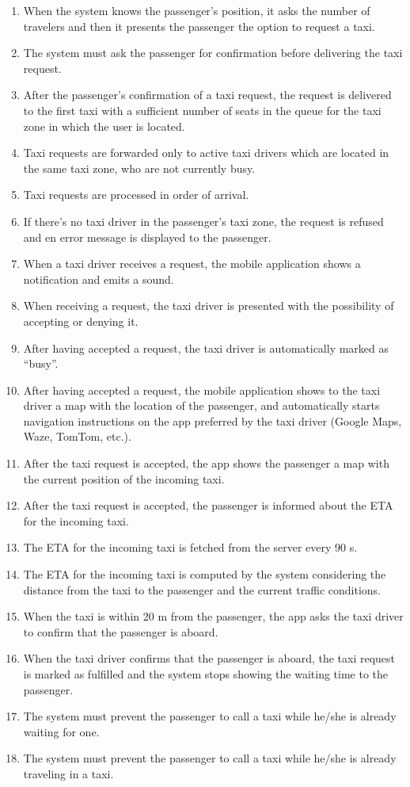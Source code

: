 \begin{enumerate}
	\item When the system knows the passenger's position, it asks the number of travelers and then it presents the passenger the option to request a taxi.
	\item The system must ask the passenger for confirmation before delivering the taxi request.
	\item After the passenger's confirmation of a taxi request, the request is delivered to the first taxi with a sufficient number of seats in the queue for the taxi zone in which the user is located.
	\item Taxi requests are forwarded only to active taxi drivers which are located in the same taxi zone, who are not currently busy.
	\item Taxi requests are processed in order of arrival.
	\item If there's no taxi driver in the passenger's taxi zone, the request is refused and en error message is displayed to the passenger.
	\item When a taxi driver receives a request, the mobile application shows a notification and emits a sound.
	\item When receiving a request, the taxi driver is presented with the possibility of accepting or denying it.
	\item After having accepted a request, the taxi driver is automatically marked as ``busy''.
	\item After having accepted a request, the mobile application shows to the taxi driver a map with the location of the passenger, and automatically starts navigation instructions on the app preferred by the taxi driver (Google Maps, Waze, TomTom, etc.).
	\item After the taxi request is accepted, the app shows the passenger a map with the current position of the incoming taxi.
	\item After the taxi request is accepted, the passenger is informed about the ETA for the incoming taxi.
	\item The ETA for the incoming taxi is fetched from the server every 90 s.
	\item The ETA for the incoming taxi is computed by the system considering the distance from the taxi to the passenger and the current traffic conditions.
	\item When the taxi is within 20 m from the passenger, the app asks the taxi driver to confirm that the passenger is aboard.
	\item When the taxi driver confirms that the passenger is aboard, the taxi request is marked as fulfilled and the system stops showing the waiting time to the passenger.
	\item The system must prevent the passenger to call a taxi while he/she is already waiting for one.
	\item The system must prevent the passenger to call a taxi while he/she is already traveling in a taxi.
\end{enumerate}
